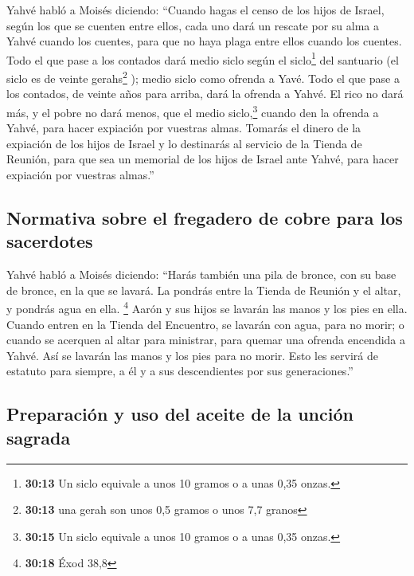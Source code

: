  Yahvé habló a Moisés diciendo:  ``Cuando
hagas el censo de los hijos de Israel, según los que se cuenten entre
ellos, cada uno dará un rescate por su alma a Yahvé cuando los cuentes,
para que no haya plaga entre ellos cuando los cuentes. 
Todo el que pase a los contados dará medio siclo según el
siclo\footnote{\textbf{30:13} Un siclo equivale a unos 10 gramos o a
  unas 0,35 onzas.} del santuario (el siclo es de veinte
gerahs\footnote{\textbf{30:13} una gerah son unos 0,5 gramos o unos 7,7
  granos} ); medio siclo como ofrenda a Yavé.  Todo el
que pase a los contados, de veinte años para arriba, dará la ofrenda a
Yahvé.  El rico no dará más, y el pobre no dará menos,
que el medio siclo,\footnote{\textbf{30:15} Un siclo equivale a unos 10
  gramos o a unas 0,35 onzas.} cuando den la ofrenda a Yahvé, para hacer
expiación por vuestras almas.  Tomarás el dinero de la
expiación de los hijos de Israel y lo destinarás al servicio de la
Tienda de Reunión, para que sea un memorial de los hijos de Israel ante
Yahvé, para hacer expiación por vuestras almas.''

\hypertarget{normativa-sobre-el-fregadero-de-cobre-para-los-sacerdotes}{%
\subsection{Normativa sobre el fregadero de cobre para los
sacerdotes}\label{normativa-sobre-el-fregadero-de-cobre-para-los-sacerdotes}}

 Yahvé habló a Moisés diciendo:  ``Harás
también una pila de bronce, con su base de bronce, en la que se lavará.
La pondrás entre la Tienda de Reunión y el altar, y pondrás agua en
ella. \footnote{\textbf{30:18} Éxod 38,8}  Aarón y sus
hijos se lavarán las manos y los pies en ella.  Cuando
entren en la Tienda del Encuentro, se lavarán con agua, para no morir; o
cuando se acerquen al altar para ministrar, para quemar una ofrenda
encendida a Yahvé.  Así se lavarán las manos y los pies
para no morir. Esto les servirá de estatuto para siempre, a él y a sus
descendientes por sus generaciones.''

\hypertarget{preparaciuxf3n-y-uso-del-aceite-de-la-unciuxf3n-sagrada}{%
\subsection{Preparación y uso del aceite de la unción
sagrada}\label{preparaciuxf3n-y-uso-del-aceite-de-la-unciuxf3n-sagrada}}

